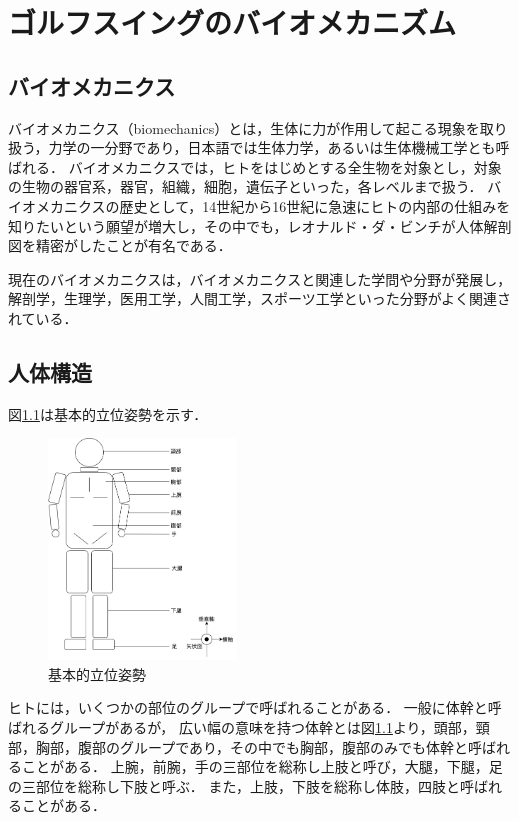 \chapter{ゴルフスイングのバイオメカニズム}
\section{バイオメカニクス}
%
バイオメカニクス（biomechanics）とは，生体に力が作用して起こる現象を取り扱う，力学の一分野であり，日本語では生体力学，あるいは生体機械工学とも呼ばれる．
バイオメカニクスでは，ヒトをはじめとする全生物を対象とし，対象の生物の器官系，器官，組織，細胞，遺伝子といった，各レベルまで扱う．
バイオメカニクスの歴史として，14世紀から16世紀に急速にヒトの内部の仕組みを知りたいという願望が増大し，その中でも，レオナルド・ダ・ビンチが人体解剖図を精密がしたことが有名である．

現在のバイオメカニクスは，バイオメカニクスと関連した学問や分野が発展し，解剖学，生理学，医用工学，人間工学，スポーツ工学といった分野がよく関連されている．
%
\section{人体構造}
図\ref{基本的立位姿勢}は基本的立位姿勢を示す．
\begin{figure}
    \begin{center}
        \includegraphics[width = 5cm]{./images/human_body.png}
        \caption{基本的立位姿勢}
        \label{基本的立位姿勢}
    \end{center}
\end{figure}
ヒトには，いくつかの部位のグループで呼ばれることがある．
一般に体幹と呼ばれるグループがあるが，
広い幅の意味を持つ体幹とは図\ref{基本的立位姿勢}より，頭部，頸部，胸部，腹部のグループであり，その中でも胸部，腹部のみでも体幹と呼ばれることがある．
上腕，前腕，手の三部位を総称し上肢と呼び，大腿，下腿，足の三部位を総称し下肢と呼ぶ．
また，上肢，下肢を総称し体肢，四肢と呼ばれることがある．


